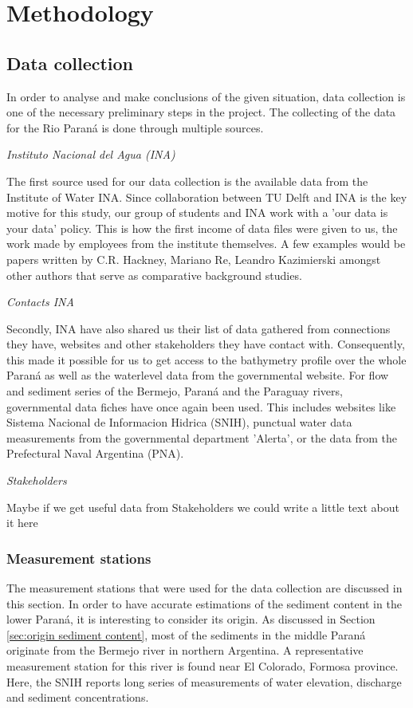 \chapter{Methodology}


\section{Data collection}
In order to analyse and make conclusions of the given situation, data collection is one of the necessary preliminary steps in the project. 
The collecting of the data for the Rio Paraná is done through multiple sources.

\textit{Instituto Nacional del Agua (INA)}

The first source used for our data collection is the available data from the Institute of Water INA. Since collaboration between TU Delft and INA is the key motive for this study, our group of students and INA work with a 'our data is your data' policy. This is how the first income of data files were given to us, the work made by employees from the institute themselves. A few examples would be papers written by C.R. Hackney, Mariano Re, Leandro Kazimierski amongst other authors that serve as comparative background studies.

\textit{Contacts INA}

Secondly, INA have also shared us their list of data gathered from connections they have, websites and other stakeholders they have contact with. 
Consequently, this made it possible for us to get access to the bathymetry profile over the whole Paraná as well as the waterlevel data from the governmental website.
For flow and sediment series of the Bermejo, Paraná and the Paraguay rivers, governmental data fiches have once again been used. This includes websites like Sistema Nacional de Informacion Hidrica (SNIH), punctual water data measurements from the governmental department 'Alerta', or the data from the Prefectural Naval Argentina (PNA).

\textit{Stakeholders}

Maybe if we get useful data from Stakeholders we could write a little text about it here

\subsection{Measurement stations}
The measurement stations that were used for the data collection are discussed in this section. In order to have accurate estimations of the sediment content in the lower Paraná, it is interesting to consider its origin. As discussed in Section \ref{sec:origin sediment content}, most of the sediments in the middle Paraná originate from the Bermejo river in northern Argentina. A representative measurement station for this river is found near El Colorado, Formosa province. Here, the SNIH reports long series of measurements of water elevation, discharge and sediment concentrations.

